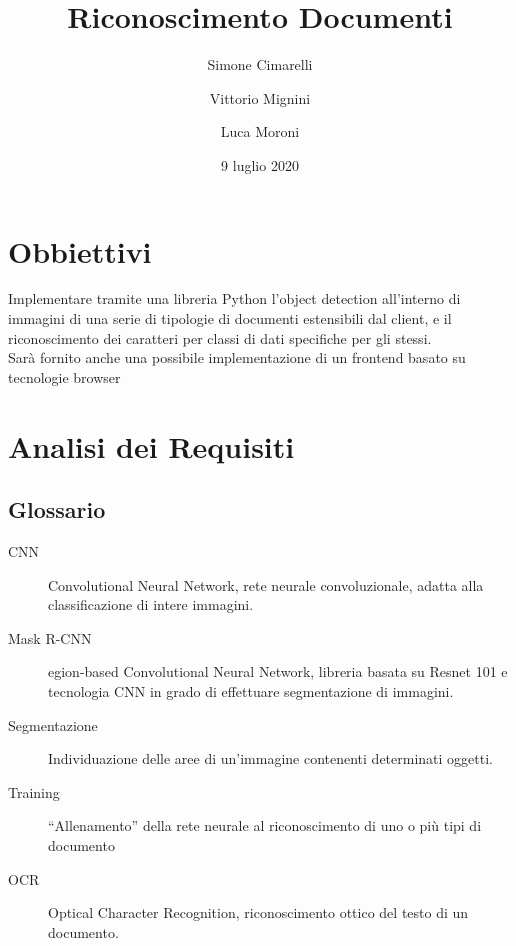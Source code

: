 \documentclass[12pt,a4paper]{article}
\begin{document}
\title{Riconoscimento Documenti}
\author{Simone Cimarelli \and Vittorio Mignini \and Luca Moroni}
\date{9 luglio 2020}

\maketitle

\begin{abstract}
\end{abstract}

\section{Obbiettivi}

Implementare tramite una libreria Python l'object detection all'interno
di immagini di una serie di tipologie di documenti estensibili dal
client, e il riconoscimento dei caratteri per classi di dati specifiche
per gli stessi.\\
Sarà fornito anche una possibile implementazione di un frontend basato
su tecnologie browser

\section{Analisi dei Requisiti}
\subsection{Glossario}

\begin{description}
    \item[CNN] Convolutional Neural Network, rete neurale
        convoluzionale, adatta alla classificazione di intere immagini.

    \item[Mask R-CNN] egion-based Convolutional Neural Network, libreria
        basata su Resnet 101 e tecnologia CNN in grado di effettuare
        segmentazione di immagini.

    \item[Segmentazione] Individuazione delle aree di un'immagine
        contenenti determinati oggetti.

    \item[Training] ``Allenamento'' della rete neurale al riconoscimento
        di uno o più tipi di documento

    \item[OCR] Optical Character Recognition, riconoscimento ottico del
        testo di un documento.

\end{description}
\end{document}
